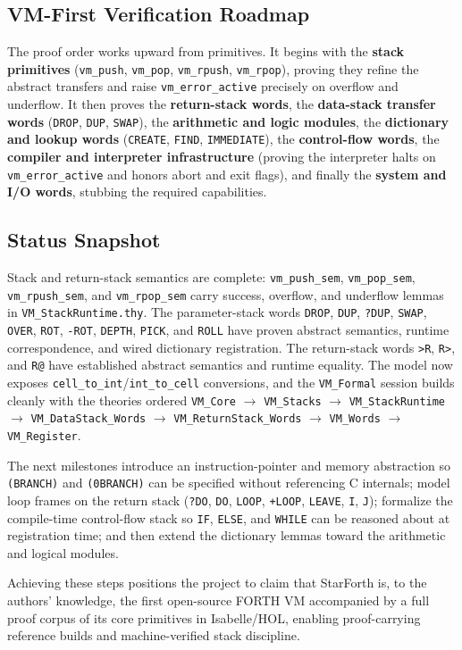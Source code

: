 \subsection{VM-First Verification Roadmap}

The proof order works upward from primitives. It begins with the \textbf{stack
primitives} (\texttt{vm\_push}, \texttt{vm\_pop}, \texttt{vm\_rpush},
\texttt{vm\_rpop}), proving they refine the abstract transfers and raise
\texttt{vm\_error\_active} precisely on overflow and underflow. It then proves the
\textbf{return-stack words}, the \textbf{data-stack transfer words}
(\texttt{DROP}, \texttt{DUP}, \texttt{SWAP}), the \textbf{arithmetic and logic
modules}, the \textbf{dictionary and lookup words} (\texttt{CREATE}, \texttt{FIND},
\texttt{IMMEDIATE}), the \textbf{control-flow words}, the \textbf{compiler and
interpreter infrastructure} (proving the interpreter halts on
\texttt{vm\_error\_active} and honors abort and exit flags), and finally the
\textbf{system and I/O words}, stubbing the required capabilities.

\subsection{Status Snapshot}

Stack and return-stack semantics are complete:
\texttt{vm\_push\_sem}, \texttt{vm\_pop\_sem}, \texttt{vm\_rpush\_sem}, and
\texttt{vm\_rpop\_sem} carry success, overflow, and underflow lemmas in
\texttt{VM\_StackRuntime.thy}. The parameter-stack words \texttt{DROP}, \texttt{DUP},
\texttt{?DUP}, \texttt{SWAP}, \texttt{OVER}, \texttt{ROT}, \texttt{-ROT},
\texttt{DEPTH}, \texttt{PICK}, and \texttt{ROLL} have proven abstract semantics,
runtime correspondence, and wired dictionary registration. The return-stack words
\texttt{>R}, \texttt{R>}, and \texttt{R@} have established abstract semantics and
runtime equality. The model now exposes \texttt{cell\_to\_int}/\texttt{int\_to\_cell}
conversions, and the \texttt{VM\_Formal} session builds cleanly with the theories
ordered \texttt{VM\_Core} $\to$ \texttt{VM\_Stacks} $\to$ \texttt{VM\_StackRuntime}
$\to$ \texttt{VM\_DataStack\_Words} $\to$ \texttt{VM\_ReturnStack\_Words} $\to$
\texttt{VM\_Words} $\to$ \texttt{VM\_Register}.

The next milestones introduce an instruction-pointer and memory abstraction so
\texttt{(BRANCH)} and \texttt{(0BRANCH)} can be specified without referencing C
internals; model loop frames on the return stack (\texttt{?DO}, \texttt{DO},
\texttt{LOOP}, \texttt{+LOOP}, \texttt{LEAVE}, \texttt{I}, \texttt{J}); formalize the
compile-time control-flow stack so \texttt{IF}, \texttt{ELSE}, and \texttt{WHILE} can
be reasoned about at registration time; and then extend the dictionary lemmas toward
the arithmetic and logical modules.

Achieving these steps positions the project to claim that StarForth is, to the
authors' knowledge, the first open-source FORTH VM accompanied by a full proof corpus
of its core primitives in Isabelle/HOL, enabling proof-carrying reference builds and
machine-verified stack discipline.

